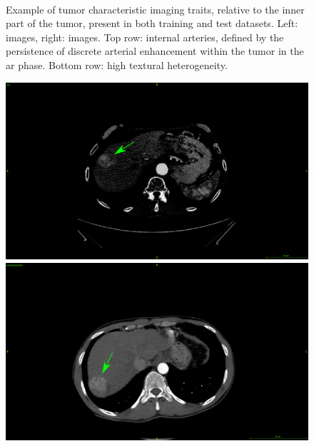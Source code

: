 {\begin{figure}[!ht]
\begin{mdframed}[backgroundcolor=blue!50,linecolor=blue!50]
\begin{minipage}{0.45\linewidth}
		\end{minipage} \\
	\end{mdframed}
	\caption{Example of tumor characteristic imaging traits, relative to the inner part of the tumor, present in both training and test datasets. Left: \textbf{} images, right: \textbf{} images. Top row: internal arteries, defined by the persistence of discrete arterial enhancement within the tumor in the \ac{ar} phase. Bottom row: high textural heterogeneity.}
	\label{fig:InterDb_imagingTraits2}
\end{figure}
\begin{figure}[!ht]
	\begin{mdframed}[backgroundcolor=blue!50,linecolor=blue!50]
		\centering
		\begin{minipage}{0.45\linewidth}
			\includegraphics[width=\linewidth]{images/ImagingTraits/GDB_washin}
		\end{minipage} \hspace{-0.1cm}
		\begin{minipage}{0.45\linewidth}
			\includegraphics[width=\linewidth]{images/ImagingTraits/TCIA_washin}

\end{minipage}
\end{mdframed}
\end{figure}}
